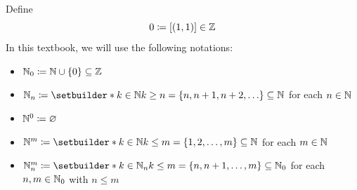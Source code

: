 \bigskip

\begin{remark}
    Define
    \[
    0 \coloneqq [(1, 1)] \in \Z
    \]
    In this textbook, we will use the following notations:
    \begin{itemize}
        \item $\N_{0} \coloneqq \N \cup \set*{0} \subseteq \Z$
        \item $\N_{n} \coloneqq \setbuilder*{k \in \N}{k \geq n} =
        \set*{n, n + 1, n + 2, \dots} \subseteq \N$ for each $n \in \N$
        \item $\N^{0} \coloneqq \vnot$
        \item $\N^{m} \coloneqq \setbuilder*{k \in \N}{k \leq m} =
        \set*{1, 2, \dots, m} \subseteq \N$ for each $m \in \N$
        \item $\N_{n}^{m} \coloneqq \setbuilder*{k \in \N_{n}}{k \leq m} =
        \set*{n, n + 1, \dots, m} \subseteq \N_{0}$ for each $n, m \in \N_{0}$ with $n \leq m$
    \end{itemize}
\end{remark}
